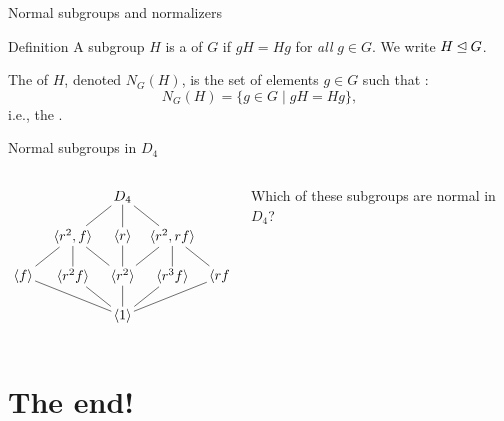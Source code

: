 \documentclass[8pt, handout]{beamer}
\newcommand{\Pause}{\pause}      %
\begin{document}
\begin{frame}{Normal subgroups and normalizers}
  \vspace{-2mm}\Pause
  
  \begin{block}{Definition}
    A subgroup $H$ is a  of $G$ if
    $gH=Hg$ for \emph{all} $g\in G$. We write $H\unlhd G$. \medskip\Pause
    
    The  of $H$, denoted
    $N_G(H)$, is the set of elements $g\in G$ such that :
    \[
    N_G(H)=\big\{g\in G\mid gH=Hg\big\},
    \]
    i.e., the . 
  \end{block}
  
\end{frame}


\begin{frame}{Normal subgroups in $D_4$}
  \begin{columns}
    \begin{column}{0.5\textwidth}
      \[
      \begin{tikzpicture}[shorten >= -2pt,
        shorten <= -2pt]
        \node (D4) at (0,4) {$D_4$};
        \node (r2-f) at (-1.25,3) {$\<r^2,f\>$};
        \node (r) at (0,3) {$\<r\>$};
        \node (r2-rf) at (1.25,3) {$\<r^2,rf\>$};
        \node (f) at (-2.5,2) {$\<f\>$};
        \node (r2f) at (-1.25,2) {$\<r^2f\>$};
        \node (r2) at (0,2) {$\<r^2\>$};
        \node (r3f) at (1.25,2) {$\<r^3f\>$};
        \node (rf) at (2.5,2) {$\<rf\>$};
        \node (1) at (0,1) {$\<1\>$};
        \draw (D4) to (r2-f); \draw (D4) to (r); \draw (D4) to (r2-rf);
        \draw (r2-f) to (f); \draw (r2-f) to (r2f); \draw (r2-f) to (r2);
        \draw (r2-rf) to (rf); \draw (r2-rf) to (r3f); \draw (r2-rf) to (r2);
        \draw (r2) to (r);
        \draw (r2) to (1);
        \draw (f) to (1);
        \draw (r2f) to (1); \draw (r3f) to (1); \draw (rf) to (1);
      \end{tikzpicture}
      \]
    \end{column}
    \begin{column}{0.5\textwidth}
      Which of these subgroups are normal in $D_4$?
    \end{column}
  \end{columns}
\end{frame}



\section{The end!}
\end{document}

